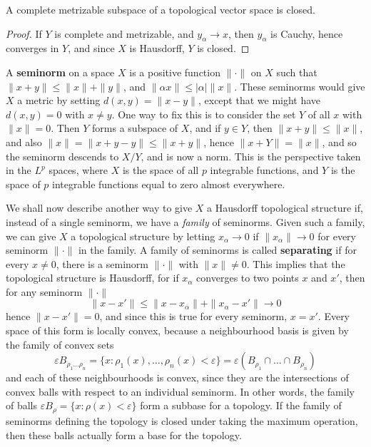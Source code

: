 \begin{theorem}
    A complete metrizable subspace of a topological vector space is closed.
\end{theorem}
\begin{proof}
    If $Y$ is complete and metrizable, and $y_\alpha \to x$, then $y_\alpha$ is Cauchy, hence converges in $Y$, and since $X$ is Hausdorff, $Y$ is closed.
\end{proof}

A {\bf seminorm} on a space $X$ is a positive function $\| \cdot \|$ on $X$ such that $\| x + y \| \leq \| x \| + \| y \|$, and $\| \alpha x \| \leq |\alpha| \| x \|$. These seminorms would give $X$ a metric by setting $d(x,y) = \| x - y \|$, except that we might have $d(x,y) = 0$ with $x \neq y$. One way to fix this is to consider the set $Y$ of all $x$ with $\| x \| = 0$. Then $Y$ forms a subspace of $X$, and if $y \in Y$, then $\| x + y \| \leq \| x \|$, and also $\| x \| = \| x + y - y \| \leq \| x + y \|$, hence $\| x + Y \| = \| x \|$, and so the seminorm descends to $X/Y$, and is now a norm. This is the perspective taken in the $L^p$ spaces, where $X$ is the space of all $p$ integrable functions, and $Y$ is the space of $p$ integrable functions equal to zero almost everywhere.

We shall now describe another way to give $X$ a Hausdorff topological structure if, instead of a single seminorm, we have a {\it family} of seminorms. Given such a family, we can give $X$ a topological structure by letting $x_\alpha \to 0$ if $\| x_\alpha \| \to 0$ for every seminorm $\| \cdot \|$ in the family. A family of seminorms is called {\bf separating} if for every $x \neq 0$, there is a seminorm $\| \cdot \|$ with $\| x \| \neq 0$. This implies that the topological structure is Hausdorff, for if $x_\alpha$ converges to two points $x$ and $x'$, then for any seminorm $\| \cdot \|$
%
\[ \| x - x' \| \leq \| x - x_\alpha \| + \| x_\alpha - x' \| \to 0 \]
%
hence $\| x - x' \| = 0$, and since this is true for every seminorm, $x = x'$. Every space of this form is locally convex, because a neighbourhood basis is given by the family of convex sets
%
\[ \varepsilon B_{\rho_1 \dots \rho_n} = \{ x: \rho_1(x), \dots, \rho_n(x) < \varepsilon \} = \varepsilon(B_{\rho_1} \cap \dots \cap B_{\rho_n}) \]
%
and each of these neighbourhoods is convex, since they are the intersections of convex balls with respect to an individual seminorm. In other words, the family of balls $\varepsilon B_\rho = \{ x : \rho(x) < \varepsilon \}$ form a subbase for a topology. If the family of seminorms defining the topology is closed under taking the maximum operation, then these balls actually form a base for the topology.

